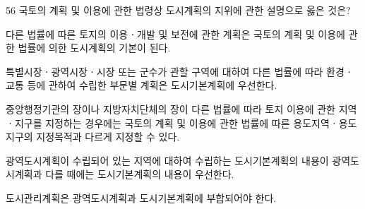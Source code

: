 \begin{question}{56}
국토의 계획 및 이용에 관한 법령상 도시계획의 지위에 관한 설명으로 옳은 것은?
\begin{choices}
  \item 다른 법률에 따른 토지의 이용ㆍ개발 및 보전에 관한 계획은 국토의 계획 및 이용에 관한 법률에 의한 도시계획의 기본이 된다.
  \item 특별시장ㆍ광역시장ㆍ시장 또는 군수가 관할 구역에 대하여 다른 법률에 따라 환경ㆍ교통 등에 관하여 수립한 부문별 계획은 도시기본계획에 우선한다.
  \item 중앙행정기관의 장이나 지방자치단체의 장이 다른 법률에 따라 토지 이용에 관한 지역ㆍ지구를 지정하는 경우에는 국토의 계획 및 이용에 관한 법률에 따른 용도지역ㆍ용도지구의 지정목적과 다르게 지정할 수 있다.
  \item 광역도시계획이 수립되어 있는 지역에 대하여 수립하는 도시기본계획의 내용이 광역도시계획과 다를 때에는 도시기본계획의 내용이 우선한다.
  \item 도시관리계획은 광역도시계획과 도시기본계획에 부합되어야 한다.
\end{choices}
\end{question}
